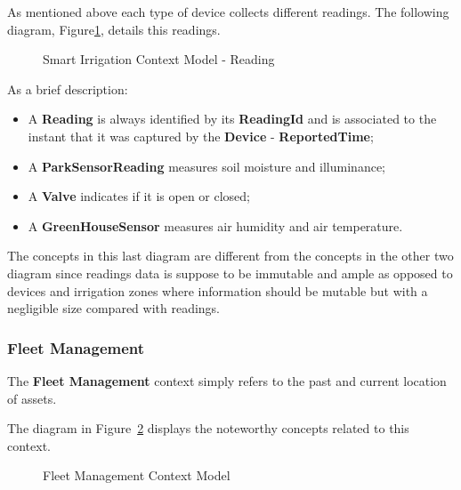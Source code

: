 As mentioned above each type of device collects different readings. The following diagram, Figure\ref{fig:design:domain:bounded_contexts:irrigation:diagram:reading}, details this readings.

\begin{figure}[H]
   \centering
  \resizebox{\columnwidth}{!}
  {
     
  }
  \caption[Smart Irrigation Context Model - Reading]{Smart Irrigation Context Model - Reading}
  \label{fig:design:domain:bounded_contexts:irrigation:diagram:reading}
\end{figure}

As a brief description:

\begin{itemize}
   \item A \textbf{Reading} is always identified by its \textbf{ReadingId} and is associated to the instant that it was captured by the \textbf{Device} - \textbf{ReportedTime};
   \item A \textbf{ParkSensorReading} measures soil moisture and illuminance;
   \item A \textbf{Valve} indicates if it is open or closed;
   \item A \textbf{GreenHouseSensor} measures air humidity and air temperature.
\end{itemize}

The concepts in this last diagram are different from the concepts in the other two diagram since readings data is suppose to be immutable and ample as opposed to devices and irrigation zones where information should be mutable but with a negligible size compared with readings.

\subsubsection*{Fleet Management}
\label{subsubsec:design:domain:bounded_contexts:fleet}

The \textbf{Fleet Management} context simply refers to the past and current location of assets. 

The diagram in Figure~\ref{fig:design:domain:bounded_contexts:fleet:diagram} displays the noteworthy concepts related to this context.

\begin{figure}[H]
   \centering
  \resizebox{\columnwidth}{!}
  {
     
  }
  \caption[Fleet Management Context Model]{Fleet Management Context Model}
  \label{fig:design:domain:bounded_contexts:fleet:diagram}
\end{figure}

